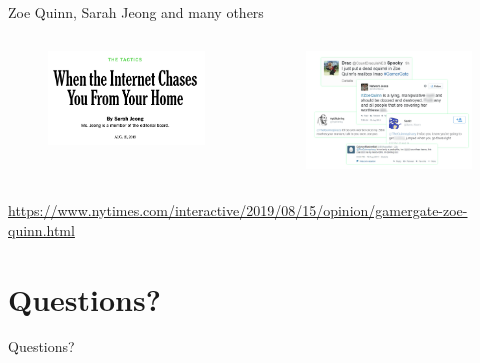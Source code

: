 \documentclass[nobackground,dvipsnames,table]{beamer}
\begin{document}
\begin{frame}{Zoe Quinn, Sarah Jeong and many others}
    \begin{columns}[T]
            \begin{figure}
                \includegraphics[width=\textwidth]{sarah-jeong-nyt-article}
            \end{figure}
            \begin{figure}
                \includegraphics[width=\textwidth]{zoe-quinn-threatening-tweets}
            \end{figure}
    \end{columns}
    
    \tiny
    \url{https://www.nytimes.com/interactive/2019/08/15/opinion/gamergate-zoe-quinn.html}
\end{frame}

\section{Questions?}

\begin{frame}{}
    \thispagestyle{empty}
    Questions?
\end{frame}
\end{document}

